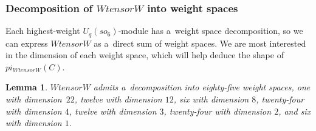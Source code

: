 \documentclass[10pt,a4paper]{amsart}
\numberwithin{equation}{section}
\newtheorem{Lemma}[Theorem]{Lemma}
\theoremstyle{definition}
\def\boldsymbol#1{#1}
\def\mathcal#1{#1}
\def\mathfrak#1{#1}
\def\pi{pi}
\def\otimes{ tensor }
\begin{document}
\subsubsection[Decomposition of W tensor W into weight spaces]{Decomposition of $\boldsymbol{W \otimes W}$ into weight spaces}
Each highest-weight $\mathcal{U}_q(\mathfrak{so}_6)$-module has a~weight space decomposition, so we can express $W \otimes W$ as a~direct sum of weight spaces. We are most interested in the dimension of each weight space, which will help deduce the shape of $\pi_{W \otimes W}(C)$. \label{subsect-weightspacedecomp}

\begin{Lemma}\label{WeightSpaceLemma}
 $W \otimes W$ admits a~decomposition into eighty-five weight spaces, one with dimension~$22$, twelve with dimension $12$, six with dimension $8$, twenty-four with dimension $4$, twelve with dimension $3$, twenty-four with dimension $2$, and six with dimension $1$.
\end{Lemma}
\end{document}
